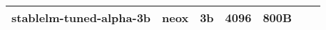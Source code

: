 \begin{table}[]
\begin{adjustbox}{max width=\textwidth}
\begin{tabular}{ccccccc}
stablelm-tuned-alpha-3b                                        & neox                                & 3b                               & 4096                                &             800B                       &                                                                                                                           &      \\
\bottomrule
\end{tabular}
\end{adjustbox}
\end{table}